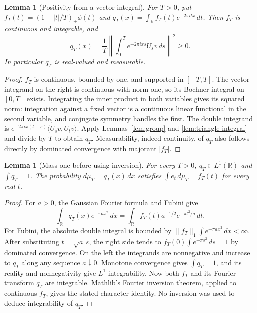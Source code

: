 \documentclass[reqno,a4paper,12pt]{amsart}
\newtheorem{lemma}[theorem]{Lemma}
\theoremstyle{definition}
\newcommand{\R}{\mathbb R}
\newcommand{\ip}[2]{\langle #1,#2\rangle}
\begin{document}
\begin{lemma}[Positivity from a vector integral]\label{lem:positive-density}
For $T>0$, put $f_T(t)=(1-|t|/T)_+\phi(t)$ and
$q_T(x)=\int_\R f_T(t)e^{-2\pi itx}\,dt$.
Then $f_T$ is continuous and integrable, and
\[
 q_T(x)=\frac1T
 \left\|\int_0^T e^{-2\pi ixs}U_sv\,ds\right\|^2\ge0.
\]
In particular $q_T$ is real-valued and measurable.
\end{lemma}
\begin{proof}
$f_T$ is continuous, bounded by one, and supported in $[-T,T]$.
The vector integrand on the right is continuous with norm one, so
its Bochner integral on $[0,T]$ exists.
Integrating the inner product in both variables gives its squared norm:
integration against a fixed vector is a continuous linear functional
in the second variable, and conjugate symmetry handles the first.
The double integrand is
$e^{-2\pi ix(t-s)}\ip{U_sv}{U_tv}$.
Apply Lemmas~\ref{lem:group} and \ref{lem:triangle-integral} and divide
by $T$ to obtain $q_T$. Measurability, indeed continuity, of $q_T$
also follows directly by dominated convergence with majorant $|f_T|$.
\end{proof}

\begin{lemma}[Mass one before using inversion]\label{lem:density-mass}
For every $T>0$, $q_T\in L^1(\R)$ and $\int q_T=1$.
The probability $d\mu_T=q_T(x)\,dx$ satisfies
$\int e_t\,d\mu_T=f_T(t)$ for every real $t$.
\end{lemma}
\begin{proof}
For $a>0$, the Gaussian Fourier formula and Fubini give
\[
 \int_\R q_T(x)e^{-\pi a x^2}\,dx
 =\int_\R f_T(t)a^{-1/2}e^{-\pi t^2/a}\,dt.
\]
For Fubini, the absolute double integral is bounded by
$\|f_T\|_1\int e^{-\pi a x^2}\,dx<\infty$.
After substituting $t=\sqrt a\,s$, the right side tends to
$f_T(0)\int e^{-\pi s^2}\,ds=1$ by dominated convergence.
On the left the integrands are nonnegative and increase to $q_T$
along any sequence $a\downarrow0$. Monotone convergence gives
$\int q_T=1$, and its reality and nonnegativity give $L^1$ integrability.
Now both $f_T$ and its Fourier transform $q_T$ are integrable.
Mathlib's Fourier inversion theorem, applied to continuous $f_T$,
gives the stated character identity. No inversion was used to
deduce integrability of $q_T$.
\end{proof}
\end{document}
